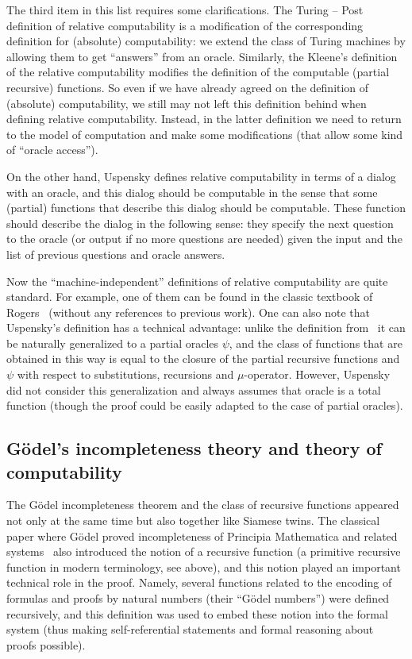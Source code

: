 \documentclass[12pt]{article}
\theoremstyle{remark}
\newcommand{\nb}[1]{{\color{red}}}
\begin{document}
The third item in this list requires some clarifications. The Turing -- Post definition of relative computability is a modification of the corresponding definition for (absolute) computability: we extend the class of Turing machines by allowing them to get ``answers'' from an oracle. Similarly, the Kleene's definition of the relative computability modifies the definition of the computable (partial recursive) functions. So even if we have already agreed on the definition of (absolute) computability, we still may not left this definition behind when defining relative computability. Instead, in the latter definition we need to return to the model of computation and make some modifications (that allow some kind of ``oracle access'').

On the other hand, Uspensky defines relative computability in terms of a dialog with an oracle, and this dialog should be computable in the sense that some (partial) functions that describe this dialog should be computable. These function should describe the dialog in the following sense: they specify the next question to the oracle (or output if no more questions are needed) given the input and the list of previous questions and oracle answers.

Now the ``machine-independent'' definitions of relative computability are quite standard. For example, one of them can be found in the classic textbook of Rogers~\cite[Section 9.2]{Rogers1972} (without any references to previous work). One can also note that Uspensky's definition has a technical advantage: unlike the definition from~\cite{Rogers1972} it can be naturally generalized to a partial oracles $\psi$, and the class of functions that are obtained in this way is equal to the closure of the partial recursive functions and $\psi$ with respect to substitutions, recursions and $\mu$-operator.
However, Uspensky did not consider this generalization and always assumes that oracle is a total function (though the proof could be easily adapted to the case of partial oracles).

\subsection*{G\"{o}del's incompleteness theory and theory of computability}

The G\"{o}del incompleteness theorem and the class of recursive functions appeared not only at the same time but also together like Siamese twins. The classical paper where G\"{o}del proved incompleteness of Principia Mathematica and related systems~\cite{Godel1931} also introduced the notion of a recursive function (a primitive recursive function in modern terminology, see above), and this notion played an important technical role in the proof. Namely, several functions related to the encoding of formulas and proofs by natural numbers (their ``G\"{odel} numbers'') were defined recursively, and this definition was used to embed these notion into the formal system (thus making self-referential statements and formal reasoning about proofs possible).
\end{document}
